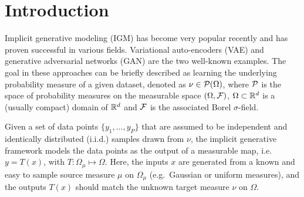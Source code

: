 
\section{Introduction}





Implicit generative modeling (IGM) \cite{diggle1984monte, mohamed2016learning} has become very popular recently and has proven
successful in various fields. Variational auto-encoders (VAE) \cite{kingma2013VAE} and generative adversarial networks (GAN) \cite{goodfellow2014generative} are the two well-known examples. The goal in these approaches can be briefly described as learning the
underlying probability measure of a given dataset, denoted as $\nu \in {\cal P}(\Omega)$, where ${\cal P}$ is the space of probability measures on the measurable space $(\Omega,\mathcal{F})$, $\Omega \subset \mathbb{R}^d$ is a (usually compact) domain of $\mathbb{R}^d$ and $\mathcal{F}$ is the associated Borel $\sigma$-field. 

Given a set of data points $\{y_1 , \dots , y_P \}$ that are assumed to be independent and identically distributed (i.i.d.) samples drawn from $\nu$, the implicit generative framework models the data points as the output of a measurable map, i.e.\ $y = T(x)$, with $T: \Omega_\mu \mapsto \Omega$. Here, the inputs $x$ are generated from a known and easy to sample source measure $\mu$ on $\Omega_\mu$ (e.g.\ Gaussian or uniform measures), and the outputs $T(x)$ should match the unknown target measure $\nu$ on $\Omega$. 

